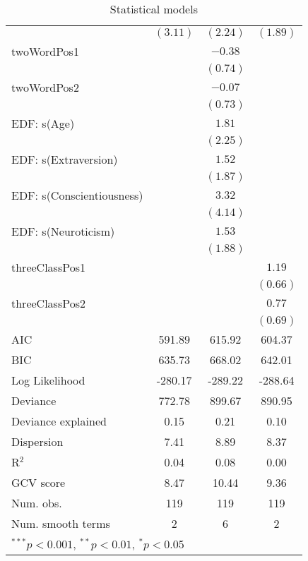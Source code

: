 \begin{table}
\begin{center}
\begin{tabular}{l c c c }
                          & $(3.11)$     & $(2.24)$     & $(1.89)$   \\
twoWordPos1               &              & $-0.38$      &            \\
                          &              & $(0.74)$     &            \\
twoWordPos2               &              & $-0.07$      &            \\
                          &              & $(0.73)$     &            \\
EDF: s(Age)               &              & $1.81$       &            \\
                          &              & $(2.25)$     &            \\
EDF: s(Extraversion)      &              & $1.52$       &            \\
                          &              & $(1.87)$     &            \\
EDF: s(Conscientiousness) &              & $3.32$       &            \\
                          &              & $(4.14)$     &            \\
EDF: s(Neuroticism)       &              & $1.53$       &            \\
                          &              & $(1.88)$     &            \\
threeClassPos1            &              &              & $1.19$     \\
                          &              &              & $(0.66)$   \\
threeClassPos2            &              &              & $0.77$     \\
                          &              &              & $(0.69)$   \\
\hline
AIC                       & 591.89       & 615.92       & 604.37     \\
BIC                       & 635.73       & 668.02       & 642.01     \\
Log Likelihood            & -280.17      & -289.22      & -288.64    \\
Deviance                  & 772.78       & 899.67       & 890.95     \\
Deviance explained        & 0.15         & 0.21         & 0.10       \\
Dispersion                & 7.41         & 8.89         & 8.37       \\
R$^2$                     & 0.04         & 0.08         & 0.00       \\
GCV score                 & 8.47         & 10.44        & 9.36       \\
Num. obs.                 & 119          & 119          & 119        \\
Num. smooth terms         & 2            & 6            & 2          \\
\hline
\multicolumn{4}{l}{\scriptsize{$^{***}p<0.001$, $^{**}p<0.01$, $^*p<0.05$}}
\end{tabular}
\caption{Statistical models}
\label{table:coefficients}
\end{center}
\end{table}